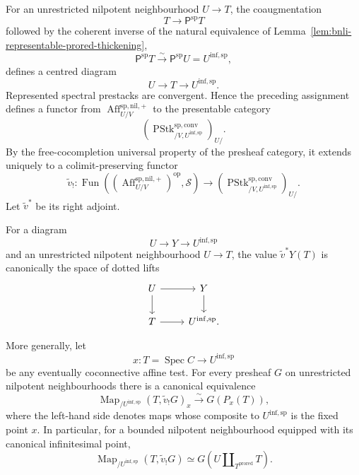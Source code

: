 \begin{construction}
\label{con:bnli-second-stage-adjunction}
For an unrestricted nilpotent neighbourhood $U\to T$, the coaugmentation
\[
    T\longrightarrow\mathsf P^{\mathrm{sp}}T
\]
followed by the coherent inverse of the natural equivalence of
Lemma~\ref{lem:bnli-representable-prored-thickening},
\[
    \mathsf P^{\mathrm{sp}}T
    \xrightarrow{\sim}
    \mathsf P^{\mathrm{sp}}U
    =
    U^{\mathrm{inf,sp}},
\]
defines a centred diagram
\[
    U\longrightarrow T\longrightarrow U^{\mathrm{inf,sp}}.
\]
Represented spectral prestacks are convergent.  Hence the preceding assignment
defines a functor from
$\operatorname{Aff}^{\mathrm{sp,nil,+}}_{U/V}$ to the presentable category
\[
    \left(
      \operatorname{PStk}^{\mathrm{sp,conv}}_{/V,U^{\mathrm{inf,sp}}}
    \right)_{U/}.
\]
By the free-cocompletion universal property of the presheaf category, it
extends uniquely to a colimit-preserving functor
\[
\boxed{
    \widetilde v_!:
    \operatorname{Fun}
    \left(
      (\operatorname{Aff}^{\mathrm{sp,nil,+}}_{U/V})^{\mathrm{op}},
      \mathcal S
    \right)
    \longrightarrow
    \left(
      \operatorname{PStk}^{\mathrm{sp,conv}}_{/V,U^{\mathrm{inf,sp}}}
    \right)_{U/}.}
\]
Let $\widetilde v^*$ be its right adjoint.
\end{construction}

\begin{proposition}
\label{prop:bnli-dotted-lift-formula}
For a diagram
\[
    U\longrightarrow Y\longrightarrow U^{\mathrm{inf,sp}}
\]
and an unrestricted nilpotent neighbourhood $U\to T$, the value
$\widetilde v^*Y(T)$ is canonically the space of dotted lifts
\[
\begin{tikzcd}
U \arrow[r] \arrow[d] & Y \arrow[d]\\
T \arrow[r] & U^{\mathrm{inf,sp}}.
\end{tikzcd}
\]

More generally, let
\[
    x:T=\operatorname{Spec}C
    \longrightarrow U^{\mathrm{inf,sp}}
\]
be any eventually coconnective affine test.  For every presheaf $G$ on
unrestricted nilpotent neighbourhoods there is a canonical equivalence
\[
\boxed{
    \operatorname{Map}_{/U^{\mathrm{inf,sp}}}
    (T,\widetilde v_!G)_x
    \xrightarrow{\sim}
    G(P_x(T)),}
\]
where the left-hand side denotes maps whose composite to
$U^{\mathrm{inf,sp}}$ is the fixed point $x$.  In particular, for a bounded
nilpotent neighbourhood equipped with its canonical infinitesimal point,
\[
\boxed{
    \operatorname{Map}_{/U^{\mathrm{inf,sp}}}
    (T,\widetilde v_!G)
    \simeq
    G(U\amalg_{T^{\mathrm{prored}}}T).}
\]
\end{proposition}

